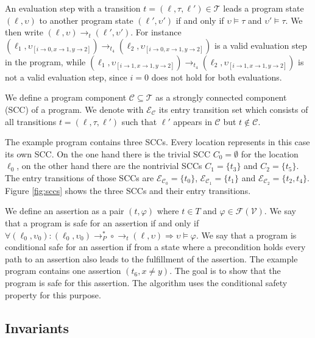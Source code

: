 An evaluation step with a transition $t = (\ell, \tau, \ell') \in \mathcal{T}$ leads a program state $(\ell, \upsilon)$ to another program state $(\ell', \upsilon')$ if and only if $\upsilon \models \tau$ and $\upsilon' \models \tau$. We then write $(\ell, \upsilon) \rightarrow_t (\ell', \upsilon')$.
For instance $(\ell_1,\upsilon_{[i \rightarrow 0, x \rightarrow 1, y \rightarrow 2]}) \rightarrow_{t_4} (\ell_2,\upsilon_{[i \rightarrow 0, x \rightarrow 1, y \rightarrow 2]})$ is a valid evaluation step in the program, while $(\ell_1,\upsilon_{[i \rightarrow 1, x \rightarrow 1, y \rightarrow 2]}) \rightarrow_{t_4} (\ell_2,\upsilon_{[i \rightarrow 1, x \rightarrow 1, y \rightarrow 2]})$ is not a valid evaluation step, since $i = 0$ does not hold for both evaluations.

We define a program component $\mathcal{C} \subseteq \mathcal{T}$ as a strongly connected component (SCC) of a program.
We denote with $\mathcal{E}_\mathcal{C}$ its entry transition set which consists of all transitions $t = (\ell, \tau, \ell')$ such that $\ell'$ appears in $\mathcal{C}$ but $t \notin \mathcal{C}$.

The example program contains three SCCs. Every location represents in this case its own SCC. On the one hand there is the trivial SCC $C_0 = \emptyset$ for the location $\ell_0$, on the other hand there are the nontrivial SCCs $C_1 = \lbrace t_3 \rbrace$ and $C_2 = \lbrace t_5 \rbrace$.
The entry transitions of those SCCs are $\mathcal{E}_{\mathcal{C}_0} = \lbrace t_0 \rbrace$, $\mathcal{E}_{\mathcal{C}_1} = \lbrace t_1 \rbrace$ and $\mathcal{E}_{\mathcal{C}_2} = \lbrace t_2, t_4 \rbrace$.
Figure \ref{fig:sccs} shows the three SCCs and their entry transitions.



We define an assertion as a pair $(t, \varphi)$ where $t \in T$ and $\varphi \in \mathcal{F}(\mathcal{V})$.
We say that a program is safe for an assertion if and only if $\forall (\ell_0, \upsilon_0): (\ell_0, \upsilon_0) \rightarrow_P^* \circ \rightarrow_t (\ell, \upsilon) \Rightarrow \upsilon \models \varphi$.
We say that a program is conditional safe for an assertion if from a state where a precondition holds every path to an assertion also leads to the fulfillment of the assertion.
The example program contains one assertion $(t_6, x \neq y)$. The goal is to show that the program is safe for this assertion. The algorithm uses the conditional safety property for this purpose.

\subsection{Invariants}

